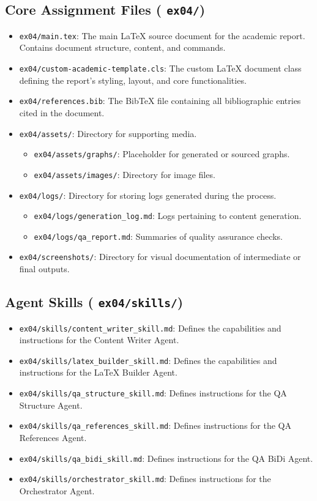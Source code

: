 \documentclass{custom-academic-template}
\begin{document}
\subsection{Core Assignment Files (	\texttt{ex04/})}
\begin{itemize}
    \item 	\texttt{ex04/main.tex}: The main LaTeX source document for the academic report. Contains document structure, content, and commands.
    \item 	\texttt{ex04/custom-academic-template.cls}: The custom LaTeX document class defining the report's styling, layout, and core functionalities.
    \item 	\texttt{ex04/references.bib}: The BibTeX file containing all bibliographic entries cited in the document.
    \item 	\texttt{ex04/assets/}: Directory for supporting media.
        \begin{itemize}
            \item 	\texttt{ex04/assets/graphs/}: Placeholder for generated or sourced graphs.
            \item 	\texttt{ex04/assets/images/}: Directory for image files.
        \end{itemize}
    \item 	\texttt{ex04/logs/}: Directory for storing logs generated during the process.
        \begin{itemize}
            \item 	\texttt{ex04/logs/generation\_log.md}: Logs pertaining to content generation.
            \item 	\texttt{ex04/logs/qa\_report.md}: Summaries of quality assurance checks.
        \end{itemize}
    \item 	\texttt{ex04/screenshots/}: Directory for visual documentation of intermediate or final outputs.
\end{itemize}

\subsection{Agent Skills (	\texttt{ex04/skills/})}
\begin{itemize}
    \item 	\texttt{ex04/skills/content\_writer\_skill.md}: Defines the capabilities and instructions for the Content Writer Agent.
    \item 	\texttt{ex04/skills/latex\_builder\_skill.md}: Defines the capabilities and instructions for the LaTeX Builder Agent.
    \item 	\texttt{ex04/skills/qa\_structure\_skill.md}: Defines instructions for the QA Structure Agent.
    \item 	\texttt{ex04/skills/qa\_references\_skill.md}: Defines instructions for the QA References Agent.
    \item 	\texttt{ex04/skills/qa\_bidi\_skill.md}: Defines instructions for the QA BiDi Agent.
    \item 	\texttt{ex04/skills/orchestrator\_skill.md}: Defines instructions for the Orchestrator Agent.
\end{itemize}
\end{document}
